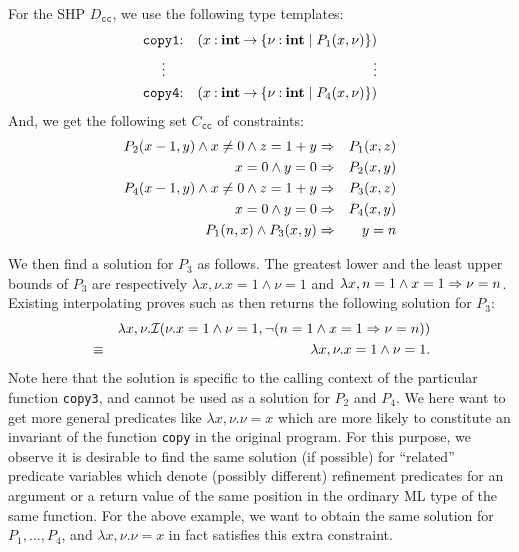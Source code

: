 For the SHP \(D_{\texttt{cc}}\), we use the following type templates:
\begin{eqnarray*}
\texttt{copy1}&\mathbin{:}&(x\mathbin{:}{\mathbf{int}}\mathbin{\rightarrow}{\{{\nu\mathbin{:}\mathbf{int} \mid P_1(x,\nu)}\}}) \\
\vdots\quad &&\qquad\qquad \vdots \\
\texttt{copy4}&\mathbin{:}&(x\mathbin{:}{\mathbf{int}}\mathbin{\rightarrow}{\{{\nu\mathbin{:}\mathbf{int} \mid P_4(x,\nu)}\}})
\end{eqnarray*}
And, we get the following set \(C_{\texttt{cc}}\) of constraints:
\begin{eqnarray*}
P_2(x-1,y) \land x\neq0 \land z=1+y &\Rightarrow& P_1(x,z) \\
x=0 \land y=0 &\Rightarrow& P_2(x,y) \\
P_4(x-1,y) \land x\neq0 \land z=1+y &\Rightarrow& P_3(x,z) \\
x=0 \land y=0 &\Rightarrow& P_4(x,y) \\
P_1(n,x) \land P_3(x,y) &\Rightarrow& y=n
\end{eqnarray*}

We then find a solution for \(P_3\) as follows.  The greatest lower and 
the least upper bounds of \(P_3\) are respectively \(\lambda x,\nu.x=1 
\land \nu=1\) and \(\lambda x,n=1 \land x=1 \Rightarrow \nu=n\).  Existing 
interpolating proves such as \cite{Beyer2008} then returns the following 
solution for \(P_3\):
\begin{eqnarray*}
&&\lambda x,\nu.\mathcal{I}(\nu.x=1 \land \nu=1,\neg (n=1 \land x=1 \Rightarrow \nu=n)) \\
&\equiv& \lambda x,\nu.x=1 \land \nu=1.
\end{eqnarray*}
Note here that the solution is specific to the calling context of the 
particular function \texttt{copy3}, and cannot be used as a solution for 
\(P_2\) and \(P_4\).  We here want to get more general predicates like 
\(\lambda x,\nu.\nu=x\) which are more likely to constitute an invariant 
of the function \texttt{copy} in the original program.  For this purpose, 
we observe it is desirable to find the same solution (if possible) for 
``related'' predicate variables which denote (possibly different) 
refinement predicates for an argument or a return value of the same 
position in the ordinary ML type of the same function.  For the above 
example, we want to obtain the same solution for \(P_1,\dots,P_4\), and 
\(\lambda x,\nu.\nu=x\) in fact satisfies this extra constraint.


